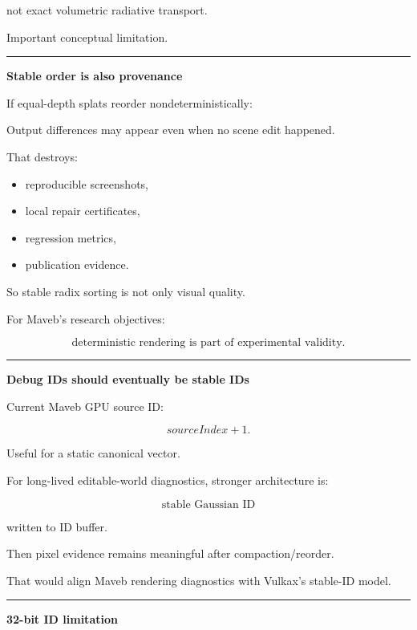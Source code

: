 not exact volumetric radiative transport.

Important conceptual limitation.

\begin{center}\rule{0.5\linewidth}{0.5pt}\end{center}

\textbf{Stable order is also provenance}

If equal-depth splats reorder nondeterministically:

Output differences may appear even when no scene edit happened.

That destroys:

\begin{itemize}
\tightlist
\item
  reproducible screenshots,
\item
  local repair certificates,
\item
  regression metrics,
\item
  publication evidence.
\end{itemize}

So stable radix sorting is not only visual quality.

For Maveb's research objectives:

\[
\boxed{
\text{deterministic rendering is part of experimental validity}.
}
\]

\begin{center}\rule{0.5\linewidth}{0.5pt}\end{center}

\textbf{Debug IDs should eventually be stable IDs}

Current Maveb GPU source ID:

\[
sourceIndex+1.
\]

Useful for a static canonical vector.

For long-lived editable-world diagnostics, stronger architecture is:

\[
\boxed{
\text{stable Gaussian ID}
}
\]

written to ID buffer.

Then pixel evidence remains meaningful after compaction/reorder.

That would align Maveb rendering diagnostics with Vulkax's stable-ID model.

\begin{center}\rule{0.5\linewidth}{0.5pt}\end{center}

\textbf{32-bit ID limitation}

